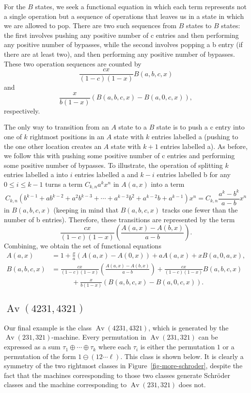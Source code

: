 \documentclass[10pt]{article}
\theoremstyle{plain}
\theoremstyle{definition}
\newcommand{\Av}{\operatorname{Av}}
\begin{document}
For the $B$ states, we seek a functional equation in which each term represents not a single operation but a sequence of operations that leaves us in a state in which we are allowed to pop. There are two such sequences from $B$ states to $B$ states: the first involves pushing any positive number of \textsf{c} entries and then performing any positive number of bypasses, while the second involves popping a \textsf{b} entry (if there are at least two), and then performing any positive number of bypasses. These two operation sequences are counted by
\[
	\frac{cx}{(1-c)(1-x)}B(a,b,c,x)
\]
	and
\[
	\frac{x}{b(1-x)}(B(a,b,c,x) - B(a,0,c,x)),
\]
respectively.

The only way to transition from an $A$ state to a $B$ state is to push a \textsf{c} entry into one of $k$ rightmost positions in an $A$ state with $k$ entries labelled \textsf{a} (pushing to the one other location creates an $A$ state with $k+1$ entries labelled \textsf{a}). As before, we follow this with pushing some positive number of \textsf{c} entries and performing some positive number of bypasses. To illustrate, the operation of splitting $k$ entries labelled \textsf{a} into $i$ entries labelled \textsf{a} and $k-i$ entries labelled \textsf{b} for any $0 \leq i \leq k-1$ turns a term $C_{k,n}a^kx^n$ in $A(a,x)$ into a term
\[
	C_{k,n}(b^{k-1} + ab^{k-2} + a^2b^{k-3} + \cdots + a^{k-3}b^2 + a^{k-2}b + a^{k-1})x^n = C_{k,n}\frac{a^k-b^k}{a-b}x^n
\]
in $B(a,b,c,x)$ (keeping in mind that $B(a,b,c,x)$ tracks one fewer than the number of \textsf{b} entries). Therefore, these transitions are represented by the term
\[
	\frac{cx}{(1-c)(1-x)}\left(\frac{A(a,x)-A(b,x)}{a-b}\right).
\]
Combining, we obtain the set of functional equations
\begin{align*}
	A(a,x) &= 1 + \frac{x}{a}(A(a,x) - A(0,x)) + aA(a,x) + xB(a,0,a,x),\\
	B(a,b,c,x) &= \frac{cx}{(1-c)(1-x)}\left(\frac{A(a,x)-A(b,x)}{a-b}\right) + \frac{cx}{(1-c)(1-x)}B(a,b,c,x)\\
	&\qquad\quad + \frac{x}{b(1-x)}(B(a,b,c,x) - B(a,0,c,x)).
\end{align*}

\subsection{$\Av(4231,4321)$}

Our final example is the class $\Av(4231,4321)$, which is generated by the $\Av(231,321)$-machine. Every permutation in $\Av(231,321)$ can be expressed as a sum $\tau_1 \oplus \cdots \oplus \tau_k$ where each $\tau_i$ is either the permutation $1$ or a permutation of the form $1 \ominus (12 \cdots \ell)$. This class is shown below. It is clearly a symmetry of the two rightmost classes in Figure~\ref{fig-more-schroder}, despite the fact that the machines corresponding to those two classes generate Schr\"oder classes and the machine corresponding to $\Av(231,321)$ does not.
\end{document}
